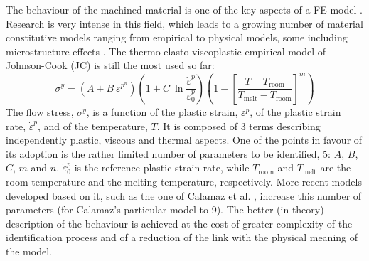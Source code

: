 \documentclass[preprint,12pt,times]{elsarticle}
\begin{document}
The behaviour of the machined material is one of the key aspects of a FE model \cite{arrazola_Recent_2013, melkote_Advances_2017}. Research is very intense in this field, which leads to a growing number of material constitutive models ranging from empirical to physical models, some including microstructure effects \cite{melkote_Advances_2017}. The thermo-elasto-viscoplastic empirical model of Johnson-Cook (JC) \cite{johnson_Constitutive_1983} is still the most used so far:
%
\begin{equation}\label{eq:J-C}
	\sigma^{y} = \left(A + B\ \varepsilon^{p^n} \right) \left(1 + C\ \ln\frac{{\dot{\varepsilon}}^p}{\dot{\varepsilon}_{0}^{p}}\right) \left(1 - \left[\frac{T - T_{\text{room}}}{T_{\text{melt}} - T_{\text{room}}}\right]^{m}\right)
\end{equation}
%
The flow stress, $\sigma^{y}$, is a function of the plastic strain, $\varepsilon^{p}$, of the plastic strain rate, ${\dot{\varepsilon}}^{p}$, and of the temperature, $T$. It is composed of 3 terms describing independently plastic, viscous and thermal aspects. One of the points in favour of its adoption is the rather limited number of parameters to be identified, 5: $A$, $B$, $C$, $m$ and $n$. $\dot{\varepsilon}_{0}^{p}$ is the reference plastic strain rate, while $T_{\text{room}}$ and $T_{\text{melt}}$ are the room temperature and the melting temperature, respectively. More recent models developed based on it, such as the one of Calamaz et al. \cite{calamaz_New_2008}, increase this number of parameters (for Calamaz's particular model to 9). The better (in theory) description of the behaviour is achieved at the cost of greater complexity of the identification process and of a reduction of the link with the physical meaning of the model.
\end{document}
